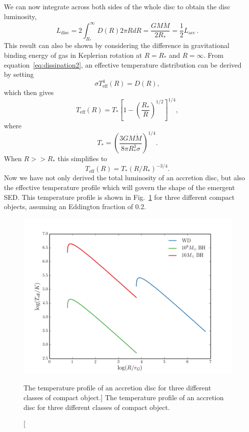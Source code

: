 We can now integrate across both sides of the whole disc to obtain the disc luminosity,
\begin{equation}
L_{\mathrm{disc}} = 2 \int^\infty_{R_*} D(R) 2\pi R dR = \frac{G M \dot{M}}{2 R_*} = \frac{1}{2} L_{\mathrm{acc}}\, .
\label{eq:ldisc}
\end{equation}
This result can also be shown by considering the difference in gravitational
binding energy of gas in Keplerian rotation at $R=R_*$ and $R=\infty$.
From equation~\ref{eq:dissipation2}, an 
effective temperature distribution can be derived by setting
\begin{equation}
\sigma T_{\mathrm{eff}}^4 (R) = D(R),
\end{equation}
which then gives
\begin{equation}
T_{\mathrm{eff}} (R) = T_* \left[1 - \left( \frac{R_*}{R} \right)^{1/2} \right]^{1/4},
\label{disk_t_profile}
\end{equation}
where
\begin{equation}
T_* = \left ( \frac{3 G M \dot{M}}{8 \pi R_*^3 \sigma} \right)^{1/4}.
\end{equation}
When $R>>R_*$ this simplifies to
\begin{equation}
T_{\mathrm{eff}} (R) = T_* (R / R_*)^{-3/4}.
\end{equation}
Now we have not only derived the total luminosity of an accretion disc, but
also the effective temperature profile which will govern the shape of the emergent SED.
This temperature profile is shown in Fig.~\ref{fig:disk_t}
for three different compact objects, assuming an Eddington fraction of 0.2.

\begin{figure}
\centering
\includegraphics[width=1.0\textwidth]{figures/01-intro/disk_t.png}
\caption
[The temperature profile of an accretion disc for three different classes
of compact object.]
{
The temperature profile of an accretion disc for three different classes
of compact object.
} 
\label{fig:disk_t}
\end{figure}

